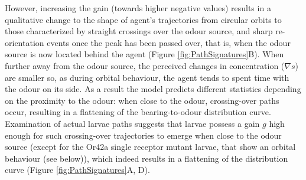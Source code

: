 \documentclass[11pt,a4paper]{article}
\begin{document}
However, increasing the gain (towards higher negative values) results in a qualitative change to the shape  of agent's trajectories from circular orbits to those characterized by straight crossings over the odour source, and sharp re-orientation events once the peak has been passed over, that is, when the odour source is now located behind the agent (Figure \ref{fig:PathSignatures}B).
 When further away from the odour source, the perceived changes in concentration ($\nabla s$)  are smaller so, as during orbital behaviour, the agent tends to spent time with the odour on its side.
  As a result the model predicts different statistics depending on the proximity to the odour: when close to the odour, crossing-over paths occur, resulting in a flattening of the bearing-to-odour distribution curve.
   Examination of actual larvae paths suggests that larvae possess a gain $g$ high enough for such crossing-over trajectories to emerge when close to the odour source (except for the Or42a single receptor mutant larvae, that show an orbital behaviour (see below)), which indeed results in a flattening of the distribution curve (Figure \ref{fig:PathSignatures}A, D).  
\end{document}
